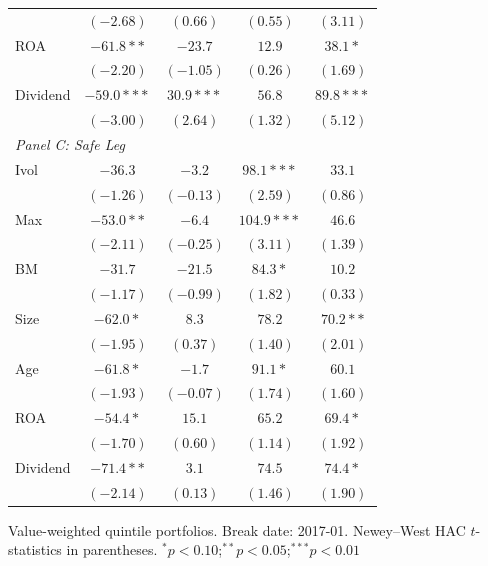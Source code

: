 \begin{table}[htbp]
\begin{tabular}{l c c c c}
 & $(-2.68)$ & $(0.66)$ & $(0.55)$ & $(3.11)$ \\
ROA & $-61.8**$ & $-23.7$ & $12.9$ & $38.1*$ \\
 & $(-2.20)$ & $(-1.05)$ & $(0.26)$ & $(1.69)$ \\
Dividend & $-59.0***$ & $30.9***$ & $56.8$ & $89.8***$ \\
 & $(-3.00)$ & $(2.64)$ & $(1.32)$ & $(5.12)$ \\
\midrule
\multicolumn{5}{l}{\textit{Panel C: Safe Leg}} \\
Ivol & $-36.3$ & $-3.2$ & $98.1***$ & $33.1$ \\
 & $(-1.26)$ & $(-0.13)$ & $(2.59)$ & $(0.86)$ \\
Max & $-53.0**$ & $-6.4$ & $104.9***$ & $46.6$ \\
 & $(-2.11)$ & $(-0.25)$ & $(3.11)$ & $(1.39)$ \\
BM & $-31.7$ & $-21.5$ & $84.3*$ & $10.2$ \\
 & $(-1.17)$ & $(-0.99)$ & $(1.82)$ & $(0.33)$ \\
Size & $-62.0*$ & $8.3$ & $78.2$ & $70.2**$ \\
 & $(-1.95)$ & $(0.37)$ & $(1.40)$ & $(2.01)$ \\
Age & $-61.8*$ & $-1.7$ & $91.1*$ & $60.1$ \\
 & $(-1.93)$ & $(-0.07)$ & $(1.74)$ & $(1.60)$ \\
ROA & $-54.4*$ & $15.1$ & $65.2$ & $69.4*$ \\
 & $(-1.70)$ & $(0.60)$ & $(1.14)$ & $(1.92)$ \\
Dividend & $-71.4**$ & $3.1$ & $74.5$ & $74.4*$ \\
 & $(-2.14)$ & $(0.13)$ & $(1.46)$ & $(1.90)$ \\
\bottomrule
\end{tabular}
\vspace{4pt}
\begin{minipage}{0.9\textwidth}
\footnotesize
Value-weighted quintile portfolios. Break date: 2017-01.
Newey--West HAC $t$-statistics in parentheses.
$^{*}p<0.10$;\quad $^{**}p<0.05$;\quad $^{***}p<0.01$
\end{minipage}
\end{table}

